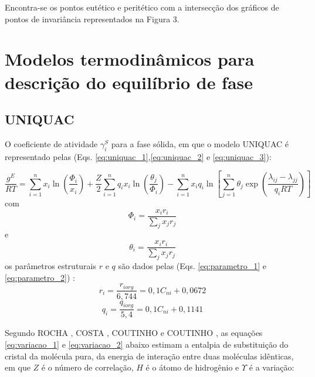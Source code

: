 Encontra-se os pontos eutético e peritético com a intersecção dos gráficos de pontos de invariância representados na Figura 3.


\section{Modelos termodinâmicos para descrição do equilíbrio de fase}
	
\subsection{UNIQUAC}
	
	O coeficiente de atividade $\gamma^{S}_{i}$ para a fase sólida, em que o modelo UNIQUAC é representado pelas (Eqs. \ref{eq:uniquac_1},\ref{eq:uniquac_2} e \ref{eq:uniquac_3}):
	
	\begin{equation}\label{eq:uniquac_1}
	\frac{g^{E}}{RT}=\sum_{i=1}^{n}x_{i} \ln\left(\frac{\Phi_{i}}{x_{i}}\right) + \frac{Z}{2}\sum_{i=1}^{n}q_{i} x_{i}\ln\left(\frac{\theta_{j}}{ \Phi_{i}}\right)-\sum_{i=1}^{n}x_{i} q_{i}\ln\left[\sum_{j=1}^{n}\theta_{j }\exp\left(\frac{\lambda_{ij}-\lambda_{jj}}{q_{i}RT}\right)\right]
	\end{equation}
	com
	\begin{equation}\label{eq:uniquac_2}
	\Phi_{i}=\frac{x_{i}r_{i}}{\displaystyle\sum_{j}x_{j}r_{j}}
	\end{equation}
	e
	\begin{equation}\label{eq:uniquac_3}
	\theta_{i}=\frac{x_{i}r_{i}}{\displaystyle\sum_{j}x_{j}r_{j}}
	\end{equation}
	os parâmetros estruturais $r$ e $q$ são dados pelas (Eqs. \ref{eq:parametro_1} e \ref{eq:parametro_2}) \cite{Coutinho2005,Coutinho2006}:
	\begin{equation}\label{eq:parametro_1}
	r_{i}=\frac{r_{iorg}}{6,744}=0,1C_{ni}+0,0672	
	\end{equation}
	\begin{equation}\label{eq:parametro_2}
	q_{i}=\frac{q_{iorg}}{5,4}=0,1C_{ni}+0,1141
	\end{equation}
	
Segundo ROCHA \citeyear{Rocha2011}, COSTA  \citeyear{Costa2007}, COUTINHO \citeyear{Coutinho2005} e COUTINHO \citeyear{Coutinho2006}, as equações \ref{eq:variacao_1} e \ref{eq:variacao_2} abaixo estimam a entalpia de substituição do cristal da molécula pura, da energia de interação entre duas moléculas idênticas, em que $Z$ é o número de correlação, $H$ é o átomo de hidrogênio e $\Upsilon$ é a variação:
	
